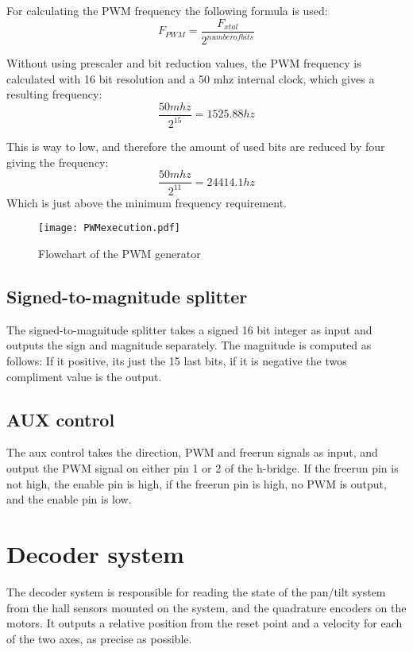 For calculating the PWM frequency the following formula is used: 
\begin{equation}
F_{PWM} = \frac{F_{xtal}}{2^{number of bits}}
\end{equation}

Without using prescaler and bit reduction values, the PWM frequency is calculated with 16 bit resolution and a 50 mhz internal clock, which gives a resulting frequency:
\begin{equation}
\frac{50 mhz}{2^{15}} = 1525.88 hz
\end{equation}

This is way to low, and therefore the amount of used bits are reduced by four giving the frequency:
\begin{equation}
\frac{50 mhz}{2^{11}} = 24414.1 hz
\end{equation}
Which is just above the minimum frequency requirement.

\begin{figure}[htb]
\texttt{[image: PWMexecution.pdf]}
\caption{Flowchart of the PWM generator}
\label{fig:PWMchart}
\end{figure}

\subsection{Signed-to-magnitude splitter}
The signed-to-magnitude splitter takes a signed 16 bit integer as input and outputs the sign and magnitude separately.
The magnitude is computed as follows:
If it positive, its just the 15 last bits, if it is negative the twos compliment value is the output.

\subsection{AUX control}
The aux control takes the direction, PWM and freerun signals as input, and output the PWM signal on either pin 1 or 2 of the h-bridge. If the freerun pin is not high, the enable pin is high, if the freerun pin is high, no PWM is output, and the enable pin is low.

\section{Decoder system}
The decoder system is responsible for reading the state of the pan/tilt system from the hall sensors mounted on the system, and the quadrature encoders on the motors. 
It outputs a relative position from the reset point and a velocity for each of the two axes, as precise as possible.

